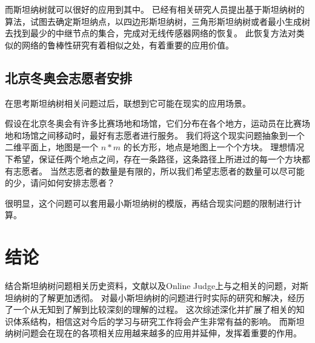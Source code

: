 \documentclass{SCIS2022cn}
\begin{document}
而斯坦纳树就可以很好的应用到其中。
已经有相关研究人员提出基于斯坦纳树的算法，试图去确定斯坦纳点，以四边形斯坦纳树，三角形斯坦纳树或者最小生成树去找到最少的中继节点的集合，完成对无线传感器网络的恢复。
此恢复方法对类似的网络的鲁棒性研究有着相似之处，有着重要的应用价值。

\subsection{北京冬奥会志愿者安排}

在思考斯坦纳树相关问题过后，联想到它可能在现实的应用场景。

假设在北京冬奥会有许多比赛场地和场馆，它们分布在各个地方，运动员在比赛场地和场馆之间移动时，最好有志愿者进行服务。
我们将这个现实问题抽象到一个二维平面上，地图是一个 $n*m$ 的长方形，地点是地图上一个个方块。
理想情况下希望，保证任两个地点之间，存在一条路径，这条路径上所进过的每一个方块都有志愿者。
当然志愿者的数量是有限的，所以我们希望志愿者的数量可以尽可能的少，请问如何安排志愿者？

很明显，这个问题可以套用最小斯坦纳树的模版，再结合现实问题的限制进行计算。

\section{结论}

结合斯坦纳树问题相关历史资料，文献以及Online Judge上与之相关的问题，对斯坦纳树的了解更加透彻。
对最小斯坦纳树的问题进行时实际的研究和解决，经历了一个从无知到了解到比较深刻的理解的过程。
这次综述深化并扩展了相关的知识体系结构，相信这对今后的学习与研究工作将会产生非常有益的影响。
而斯坦纳树问题会在现在的各项相关应用越来越多的应用并延伸，发挥着重要的作用。




\newpage
\end{document}
